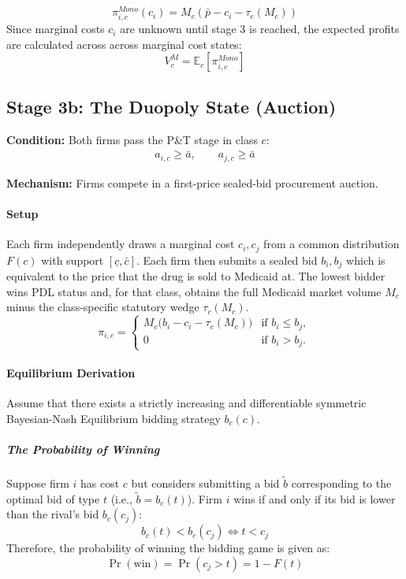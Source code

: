 \documentclass[12pt]{article}
\begin{document}
\begin{equation} \label{eq:mono_profit}
    \pi_{i,c}^{Mono}(c_i) = M_c(\bar{p} - c_i - \tau_c(M_c))
\end{equation}
Since marginal costs $c_i$ are unknown until stage 3 is reached, the expected profits are calculated across  across marginal cost states:
\begin{equation}
V_c^M = \mathbb{E}_c[\pi_{i,c}^{Mono}]
\end{equation}

\subsection{Stage 3b: The Duopoly State (Auction)}
\textbf{Condition:} Both firms pass the P\&T stage in class $c$:
\begin{align*}
    a_{i,c} \geq \bar{a}, \qquad a_{j,c} \geq \bar{a}
\end{align*}

\textbf{Mechanism:} Firms compete in a first-price sealed-bid procurement auction.

\paragraph{Setup}
Each firm independently draws a marginal cost $c_i, c_j$ from a common distribution $F(c)$ with support $[\underline{c}, \bar{c}]$. Each firm then submits a sealed bid $b_i, b_j$ which is equivalent to the price that the drug is sold to Medicaid at. The lowest bidder wins PDL status and, for that class, obtains the full Medicaid market volume $M_c$ minus the class-specific statutory wedge $\tau_c(M_c)$.
\[
\pi_{i,c} =
\begin{cases}
M_c\big(b_i - c_i - \tau_c(M_c)\big) & \text{if } b_i \leq b_j, \\
0 & \text{if } b_i > b_j.
\end{cases}
\]

\paragraph{Equilibrium Derivation}
Assume that there exists a strictly increasing and differentiable symmetric Bayesian-Nash Equilibrium bidding strategy $b_c(c)$.

\subparagraph{The Probability of Winning}
Suppose firm $i$ has cost $c$ but considers submitting a bid $\tilde{b}$ corresponding to the optimal bid of type $t$ (i.e., $\tilde{b} = b_c(t)$). Firm $i$ wins if and only if its bid is lower than the rival's bid $b_c(c_j)$:
\begin{equation}
    b_c(t) < b_c(c_j) \iff t < c_j
\end{equation}
Therefore, the probability of winning the bidding game is given as:
\begin{equation}
    \Pr(\text{win}) = \Pr(c_j > t) = 1 - F(t)
\end{equation}
\end{document}
